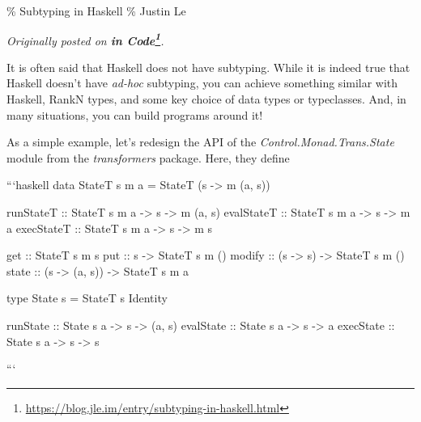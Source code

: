 \documentclass[]{article}
\renewcommand{\href}[2]{#2\footnote{\url{#1}}}
\begin{document}
\% Subtyping in Haskell \% Justin Le

\emph{Originally posted on
\textbf{\href{https://blog.jle.im/entry/subtyping-in-haskell.html}{in Code}}.}

It is often said that Haskell does not have subtyping. While it is indeed true
that Haskell doesn't have \emph{ad-hoc} subtyping, you can achieve something
similar with Haskell, RankN types, and some key choice of data types or
typeclasses. And, in many situations, you can build programs around it!

As a simple example, let's redesign the API of the
\emph{Control.Monad.Trans.State} module from the \emph{transformers} package.
Here, they define

```haskell data StateT s m a = StateT (s -\textgreater{} m (a, s))

runStateT :: StateT s m a -\textgreater{} s -\textgreater{} m (a, s) evalStateT
:: StateT s m a -\textgreater{} s -\textgreater{} m a execStateT :: StateT s m a
-\textgreater{} s -\textgreater{} m s

get :: StateT s m s put :: s -\textgreater{} StateT s m () modify :: (s
-\textgreater{} s) -\textgreater{} StateT s m () state :: (s -\textgreater{} (a,
s)) -\textgreater{} StateT s m a

type State s = StateT s Identity

runState :: State s a -\textgreater{} s -\textgreater{} (a, s) evalState ::
State s a -\textgreater{} s -\textgreater{} a execState :: State s a
-\textgreater{} s -\textgreater{} s

```
\end{document}
